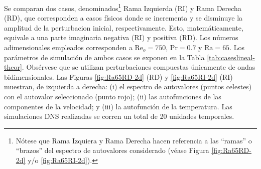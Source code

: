 Se comparan dos casos, denominados\footnote{Nótese que Rama Izquiera y Rama Derecha hacen referencia a las ``ramas'' o ``brazos'' del espectro de autovalores considerado (véase Figura \ref{fig:Ra65RD-2d} y/o \ref{fig:Ra65RI-2d}).} Rama Izquierda (RI) y Rama Derecha (RD), que corresponden a casos físicos donde se incrementa y se disminuye la amplitud de la perturbacion inicial, respectivamente. Esto, matemáticamente, equivale a una parte imaginaria negativa (RI) y positiva (RD). Los números adimensionales empleados corresponden a $\text{Re}_o=750$, $\text{Pr}=0\text{.}7$ y $\text{Ra}=65$. Los parámetros de simulación de ambos casos se exponen en la \linebreak Tabla \ref{tab:caseslineal-theor}. Obsérvese que se utilizan perturbaciones compuestas únicamente de ondas bidimensionales. Las Figuras \ref{fig:Ra65RD-2d} (RD) y \ref{fig:Ra65RI-2d} (RI) muestran, de izquierda a derecha: (i) el espectro de autovalores (puntos celestes) con el autovalor seleccionado (punto rojo); (ii) las autofunciones de las componentes de la velocidad; y (iii) la autofunción de la temperatura. Las simulaciones DNS realizadas se corren un total de 20 unidades temporales.

\begin{table}[H]
\centering
{}
\caption{Parámetros de simulación de los dos casos elegidos.}
\label{tab:caseslineal-theor}
\end{table}

